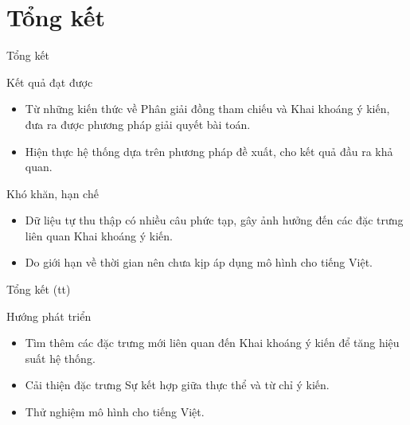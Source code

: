 \documentclass{beamer}
\begin{document}
	\section{Tổng kết}
		\begin{frame}{Tổng kết}			
			\begin{block}{Kết quả đạt được}
				\begin{itemize}
					\item Từ những kiến thức về Phân giải đồng tham chiếu và Khai khoáng ý kiến, đưa ra được phương pháp giải quyết bài toán.
					\item Hiện thực hệ thống dựa trên phương pháp đề xuất, cho kết quả đầu ra khả quan.				
				\end{itemize}
			\end{block}
			\begin{block}{Khó khăn, hạn chế}
				\begin{itemize}
					\item Dữ liệu tự thu thập có nhiều câu phức tạp, gây ảnh hưởng đến các đặc trưng liên quan Khai khoáng ý kiến. 
					\item Do giới hạn về thời gian nên chưa kịp áp dụng mô hình cho tiếng Việt.				
				\end{itemize}
			\end{block}
		\end{frame}
	
		\begin{frame}{Tổng kết (tt)}			
			\begin{block}{Hướng phát triển}
				\begin{itemize}
					\item Tìm thêm các đặc trưng mới liên quan đến Khai khoáng ý kiến để tăng hiệu suất hệ thống.
					\item Cải thiện đặc trưng Sự kết hợp giữa thực thể và từ chỉ ý kiến.
					\item Thử nghiệm mô hình cho tiếng Việt.
				\end{itemize}
			\end{block}
		\end{frame}
\end{document}
